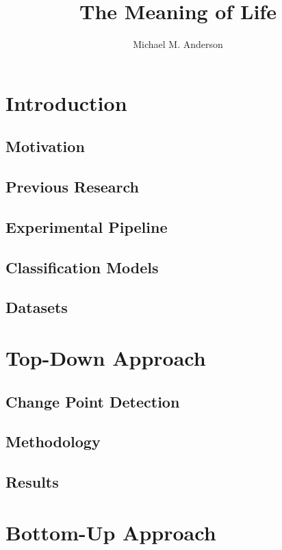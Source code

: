 \documentclass[onehalf,11pt]{beavtex}
\title{The Meaning of Life}
\author{Michael M. Anderson}
\begin{document}
\maketitle
\mainmatter




\chapter{Introduction}
\section{Motivation}
\section{Previous Research}
\section{Experimental Pipeline}
\section{Classification Models}
\section{Datasets}


\chapter{Top-Down Approach}
\section{Change Point Detection}
\section{Methodology}
\section{Results}


\chapter{Bottom-Up Approach}
\end{document}
